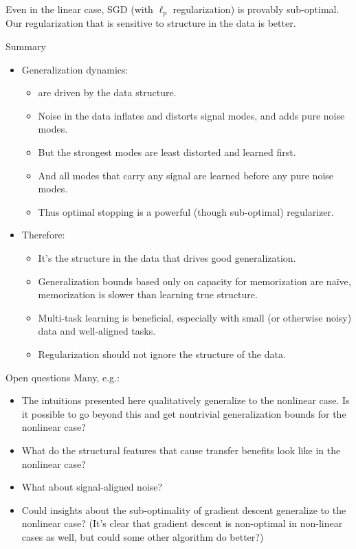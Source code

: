 \documentclass{beamer}
\begin{document}
\begin{frame}[standout]
Even in the linear case, SGD (with $\ell_p$ regularization) is provably sub-optimal.\\[1em]
Our regularization that is sensitive to structure in the data is better.
\end{frame}

\begin{frame}{Summary}
\begin{itemize}[<+->]
\item Generalization dynamics:
    \begin{itemize}
    \item are driven by the data structure.
    \item Noise in the data inflates and distorts signal modes, and adds pure noise modes.
    \item But the strongest modes are least distorted and learned first.
    \item And all modes that carry any signal are learned before any pure noise modes.
    \item Thus optimal stopping is a powerful (though sub-optimal) regularizer.
    \end{itemize}
\item Therefore:
    \begin{itemize}
    \item It's the structure in the data that drives good generalization.
    \item Generalization bounds based only on capacity for memorization are na{\"i}ve, memorization is slower than learning true structure.
    \item Multi-task learning is beneficial, especially with small (or otherwise noisy) data and well-aligned tasks.
    \item Regularization should not ignore the structure of the data.
    \end{itemize}
\end{itemize}
\end{frame}

\begin{frame}{Open questions}
Many, e.g.:
\begin{itemize}
\item The intuitions presented here qualitatively generalize to the nonlinear case. Is it possible to go beyond this and get nontrivial generalization bounds for the nonlinear case? 
\item What do the structural features that cause transfer benefits look like in the nonlinear case?
\item What about signal-aligned noise?
\item Could insights about the sub-optimality of gradient descent generalize to the nonlinear case? (It's clear that gradient descent is non-optimal in non-linear cases as well, but could some other algorithm do better?)
\end{itemize}
\end{frame}
\end{document}
